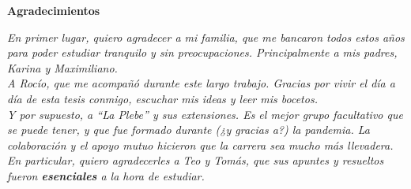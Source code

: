\thispagestyle{plain}
\begin{center}
\large
\textbf{Agradecimientos}
\end{center}

\textit{
En primer lugar, quiero agradecer a mi familia, que me bancaron todos estos años para poder estudiar tranquilo y sin preocupaciones. Principalmente a mis padres, \mbox{Karina} y \mbox{Maximiliano}.
} \\

\textit{
A Rocío, que me acompañó durante este largo trabajo. Gracias por vivir el día a día de esta tesis conmigo,  escuchar mis ideas y leer mis bocetos.
} \\

\textit{
Y por supuesto, a \enquote{La Plebe} y sus extensiones. Es el mejor grupo facultativo que se puede tener, y que fue formado durante (¿y gracias a?) la pandemia. La colaboración y el apoyo mutuo hicieron que la carrera sea mucho más llevadera. En particular, quiero agradecerles a Teo y Tomás, que sus apuntes y resueltos fueron \textbf{esenciales} a la hora de estudiar.
}

\clearpage
